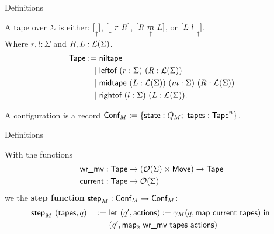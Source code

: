 \begin{frame}{Definitions}
  \begin{definition}[Tape]
    A tape over $\Sigma$ is either:
    $ [ \underset{\uparrow}{} ]$, $[ \underset{\uparrow}{}~r~R ]$, $[ R~\underset{\uparrow}{m}~L ]$, or $[ L~l~\underset{\uparrow}{} ]$,\\
    Where $r,l : \Sigma$ and $R,L : \mathcal{L}(\Sigma)$.
    \pause%
    \begin{alignat*}{2}
      \textsf{Tape} := ~ & \textsf{niltape} \\
      | ~ & \textsf{leftof}  ~ (r:\Sigma) ~ (R:\mathcal{L}(\Sigma)) \\
      | ~ & \textsf{midtape} ~ (L:\mathcal{L}(\Sigma)) ~ (m:\Sigma) ~ (R:\mathcal{L}(\Sigma)) \\
      | ~ & \textsf{rightof} ~ (l:\Sigma) ~ (L:\mathcal{L}(\Sigma)).
    \end{alignat*}
  \end{definition}
  \pause%
  \begin{definition}[Configuration]
    A configuration is a record $\textsf{Conf}_M := \{\textsf{state}:Q_M;~ \textsf{tapes}:\textsf{Tape}^n\}$.
  \end{definition}
\end{frame}

\begin{frame}{Definitions}
  \begin{definition}
    With the functions
    \begin{alignat*}{2}
      \textsf{wr\_mv}  & : \textsf{Tape} \rightarrow (\mathcal{O}(\Sigma) \times \textsf{Move}) \rightarrow \textsf{Tape} \\
      \textsf{current} & : \textsf{Tape} \rightarrow \mathcal{O}(\Sigma)
    \end{alignat*}
    we the \textbf{step function} $\textsf{step}_M : \textsf{Conf}_M \rightarrow \textsf{Conf}_M$:
    \begin{alignat*}{2}
      \textsf{step}_M &~(\textsf{tapes}, q) &~:=~& \textsf{let}~(q', \textsf{actions}) := \gamma_M(q, \textsf{map}~\textsf{current}~\textsf{tapes})~\textsf{in}~ \\
                  &                 &~  ~& (q', \textsf{map}_2~\textsf{wr\_mv}~\textsf{tapes}~\textsf{actions})
      \end{alignat*}
  \end{definition}
\end{frame}

